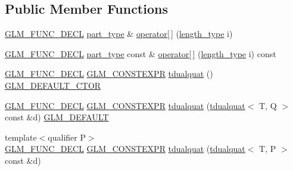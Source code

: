 \subsection*{Public Member Functions}
\begin{DoxyCompactItemize}
\item 
\mbox{\hyperlink{setup_8hpp_ab2d052de21a70539923e9bcbf6e83a51}{G\+L\+M\+\_\+\+F\+U\+N\+C\+\_\+\+D\+E\+CL}} \mbox{\hyperlink{structglm_1_1tdualquat_ab18b8665bbd568f9bc93ef93ed475a47}{part\+\_\+type}} \& \mbox{\hyperlink{structglm_1_1tdualquat_a23ea50ee4bf311b8d37155ebec56dd90}{operator\mbox{[}$\,$\mbox{]}}} (\mbox{\hyperlink{structglm_1_1tdualquat_ad9fa4fd7f84d17bebd3efed6b5455d80}{length\+\_\+type}} i)
\item 
\mbox{\hyperlink{setup_8hpp_ab2d052de21a70539923e9bcbf6e83a51}{G\+L\+M\+\_\+\+F\+U\+N\+C\+\_\+\+D\+E\+CL}} \mbox{\hyperlink{structglm_1_1tdualquat_ab18b8665bbd568f9bc93ef93ed475a47}{part\+\_\+type}} const  \& \mbox{\hyperlink{structglm_1_1tdualquat_a8a6db73181f9b7cba58d95704734f8e4}{operator\mbox{[}$\,$\mbox{]}}} (\mbox{\hyperlink{structglm_1_1tdualquat_ad9fa4fd7f84d17bebd3efed6b5455d80}{length\+\_\+type}} i) const
\item 
\mbox{\hyperlink{setup_8hpp_ab2d052de21a70539923e9bcbf6e83a51}{G\+L\+M\+\_\+\+F\+U\+N\+C\+\_\+\+D\+E\+CL}} \mbox{\hyperlink{setup_8hpp_a08b807947b47031d3a511f03f89645ad}{G\+L\+M\+\_\+\+C\+O\+N\+S\+T\+E\+X\+PR}} \mbox{\hyperlink{structglm_1_1tdualquat_ab2b5e57b73a6f79c56e9bcdc7d5e1607}{tdualquat}} () \mbox{\hyperlink{setup_8hpp_afb97a4e995bc004c0cbbfa22125b80ba}{G\+L\+M\+\_\+\+D\+E\+F\+A\+U\+L\+T\+\_\+\+C\+T\+OR}}
\item 
\mbox{\hyperlink{setup_8hpp_ab2d052de21a70539923e9bcbf6e83a51}{G\+L\+M\+\_\+\+F\+U\+N\+C\+\_\+\+D\+E\+CL}} \mbox{\hyperlink{setup_8hpp_a08b807947b47031d3a511f03f89645ad}{G\+L\+M\+\_\+\+C\+O\+N\+S\+T\+E\+X\+PR}} \mbox{\hyperlink{structglm_1_1tdualquat_ad6099c663113c443a9efeeabbd321bd1}{tdualquat}} (\mbox{\hyperlink{structglm_1_1tdualquat}{tdualquat}}$<$ T, Q $>$ const \&d) \mbox{\hyperlink{setup_8hpp_aefce7051c376a64ba89fa93a9f63bc2c}{G\+L\+M\+\_\+\+D\+E\+F\+A\+U\+LT}}
\item 
{\footnotesize template$<$qualifier P$>$ }\\\mbox{\hyperlink{setup_8hpp_ab2d052de21a70539923e9bcbf6e83a51}{G\+L\+M\+\_\+\+F\+U\+N\+C\+\_\+\+D\+E\+CL}} \mbox{\hyperlink{setup_8hpp_a08b807947b47031d3a511f03f89645ad}{G\+L\+M\+\_\+\+C\+O\+N\+S\+T\+E\+X\+PR}} \mbox{\hyperlink{structglm_1_1tdualquat_a23b9100d907a648204929a4c3392a56a}{tdualquat}} (\mbox{\hyperlink{structglm_1_1tdualquat}{tdualquat}}$<$ T, P $>$ const \&d)

\end{DoxyCompactItemize}

